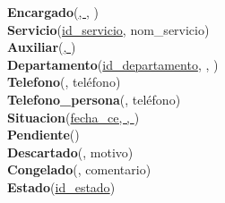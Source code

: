 \textbf{Encargado}(\underline{, }, )\\
\textbf{Servicio}(\underline{id\_servicio}, nom\_servicio)\\
\textbf{Auxiliar}(\underline{, })\\
\textbf{Departamento}(\underline{id\_departamento}, , )\\
\textbf{Telefono}(\underline{}, teléfono)\\
\textbf{Telefono\_persona}(\underline{}, teléfono)\\
\textbf{Situacion}(\underline{fecha\_ce, , })\\
\textbf{Pendiente}(\underline{})\\
\textbf{Descartado}(\underline{}, motivo)\\
\textbf{Congelado}(\underline{}, comentario)\\
\textbf{Estado}(\underline{id\_estado})\\

